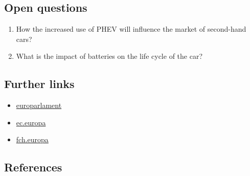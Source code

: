 \documentclass[
]{book}
\providecommand{\tightlist}{%
  \setlength{\itemsep}{0pt}\setlength{\parskip}{0pt}}
\begin{document}
\hypertarget{open-questions-37}{%
\subsection*{Open questions}\label{open-questions-37}}

\begin{enumerate}
\def\labelenumi{\arabic{enumi}.}
\tightlist
\item
  How the increased use of PHEV will influence the market of second-hand cars?
\item
  What is the impact of batteries on the life cycle of the car?
\end{enumerate}

\hypertarget{further-links-31}{%
\subsection*{Further links}\label{further-links-31}}

\begin{itemize}
\tightlist
\item
  \href{https://www.europarl.europa.eu/news/nl/press-room/20180911IPR13114/more-electric-cars-on-eu-roads-by-2030}{europarlament}
\item
  \href{https://ec.europa.eu/transport/themes/urban/vehicles/road/hydrogen_en}{ec.europa}
\item
  \href{https://www.fch.europa.eu/news/hydrogen-roadmap-europe-sustainable-pathway-european-energy-transition}{fch.europa}
\end{itemize}

\hypertarget{references-37}{%
\subsection*{References}\label{references-37}}
\end{document}
